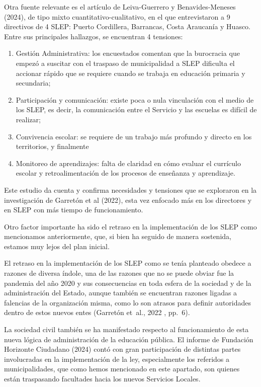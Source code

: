 \documentclass[
  12pt,
  letterpaper,
]{article}
\begin{document}
Otra fuente relevante es el artículo de Leiva-Guerrero y Benavides-Meneses (2024), de tipo mixto cuantitativo-cualitativo, en el que entrevistaron a 9 directivos de 4 SLEP: Puerto Cordillera, Barrancas, Costa Araucanía y Huasco.
Entre sus principales hallazgos, se encuentran 4 tensiones:

\begin{enumerate}
\def\labelenumi{\arabic{enumi})}
\item
  Gestión Administrativa: los encuestados comentan que la burocracia que empezó a suscitar con el traspaso de municipalidad a SLEP dificulta el accionar rápido que se requiere cuando se trabaja en educación primaria y secundaria;
\item
  Participación y comunicación: existe poca o nula vinculación con el medio de los SLEP, es decir, la comunicación entre el Servicio y las escuelas es difícil de realizar;
\item
  Convivencia escolar: se requiere de un trabajo más profundo y directo en los territorios, y finalmente
\item
  Monitoreo de aprendizajes: falta de claridad en cómo evaluar el currículo escolar y retroalimentación de los procesos de enseñanza y aprendizaje.
\end{enumerate}

Este estudio da cuenta y confirma necesidades y tensiones que se exploraron en la investigación de Garretón et al (2022), esta vez enfocado más en los directores y en SLEP con más tiempo de funcionamiento.

Otro factor importante ha sido el retraso en la implementación de los SLEP como mencionamos anteriormente, que, si bien ha seguido de manera sostenida, estamos muy lejos del plan inicial.

El retraso en la implementación de los SLEP como se tenía planteado obedece a razones de diversa índole, una de las razones que no se puede obviar fue la pandemia del año 2020 y sus consecuencias en toda esfera de la sociedad y de la administración del Estado, aunque también se encuentran razones ligadas a falencias de la organización misma, como lo son atrasos para definir autoridades dentro de estos nuevos entes (Garretón et~al., 2022 , pp.~6).

La sociedad civil también se ha manifestado respecto al funcionamiento de esta nueva lógica de administración de la educación pública.
El informe de Fundación Horizonte Ciudadano (2024) contó con gran participación de distintas partes involucradas en la implementación de la ley, especialmente los referidos a municipalidades, que como hemos mencionado en este apartado, son quienes están traspasando facultades hacia los nuevos Servicios Locales.
\end{document}

